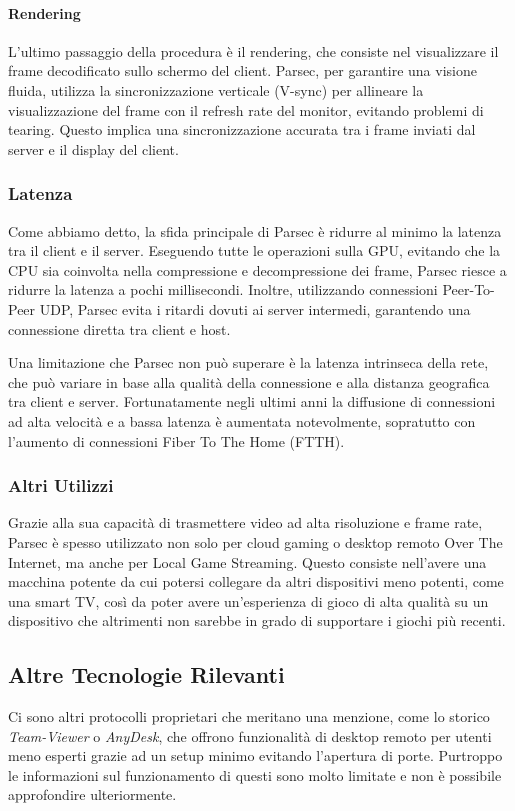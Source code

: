 \documentclass[12pt,a4paper,openright,twoside]{book}
\begin{document}
\paragraph{Rendering}
L'ultimo passaggio della procedura è il rendering, che consiste nel visualizzare il frame decodificato sullo schermo del client. Parsec, per garantire una visione fluida, utilizza la sincronizzazione verticale (V-sync) per allineare la visualizzazione del frame con il refresh rate del monitor, evitando problemi di tearing. Questo implica una sincronizzazione accurata tra i frame inviati dal server e il display del client.

\subsubsection{Latenza}
\label{sec:latenza-parsec}

Come abbiamo detto, la sfida principale di Parsec è ridurre al minimo la latenza tra il client e il server. Eseguendo tutte le operazioni sulla GPU, evitando che la CPU sia coinvolta nella compressione e decompressione dei frame, Parsec riesce a ridurre la latenza a pochi millisecondi. Inoltre, utilizzando connessioni Peer-To-Peer UDP, Parsec evita i ritardi dovuti ai server intermedi, garantendo una connessione diretta tra client e host. 

Una limitazione che Parsec non può superare è la latenza intrinseca della rete, che può variare in base alla qualità della connessione e alla distanza geografica tra client e server. Fortunatamente negli ultimi anni la diffusione di connessioni ad alta velocità e a bassa latenza è aumentata notevolmente, sopratutto con l'aumento di connessioni Fiber To The Home (FTTH).

\subsubsection{Altri Utilizzi}
Grazie alla sua capacità di trasmettere video ad alta risoluzione e frame rate, Parsec è spesso utilizzato non solo per cloud gaming o desktop remoto Over The Internet, ma anche per Local Game Streaming. Questo consiste nell'avere una macchina potente da cui potersi collegare da altri dispositivi meno potenti, come una smart TV, così da poter avere un'esperienza di gioco di alta qualità su un dispositivo che altrimenti non sarebbe in grado di supportare i giochi più recenti.

\subsection{Altre Tecnologie Rilevanti}
Ci sono altri protocolli proprietari che meritano una menzione, come lo storico \emph{Team-Viewer} o \emph{AnyDesk}, che offrono funzionalità di desktop remoto per utenti meno esperti grazie ad un setup minimo evitando l'apertura di porte. Purtroppo le informazioni sul funzionamento di questi sono molto limitate e non è possibile approfondire ulteriormente.
\end{document}
